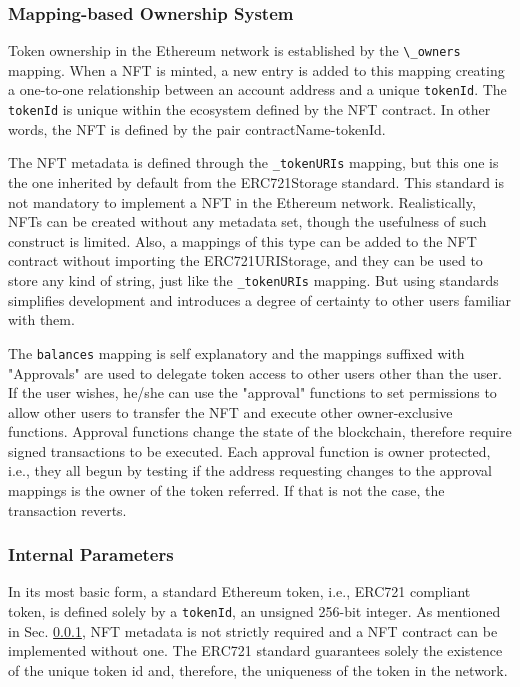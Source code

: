\documentclass[../main.tex]{subfiles}
\begin{document}
\subsubsection{Mapping-based Ownership System}
\label{sec:mappings}
Token ownership in the Ethereum network is established by the \verb|\_owners| mapping. When a NFT is minted, a new entry is added to this mapping creating a one-to-one relationship between an account address and a unique \verb|tokenId|. The \verb|tokenId| is unique within the ecosystem defined by the NFT contract. In other words, the NFT is defined by the pair contractName-tokenId.
\par
The NFT metadata is defined through the \verb|_tokenURIs| mapping, but this one is the one inherited by default from the ERC721Storage standard. This standard is not mandatory to implement a NFT in the Ethereum network. Realistically, NFTs can be created without any metadata set, though the usefulness of such construct is limited. Also, a mappings of this type can be added to the NFT contract without importing the ERC721URIStorage, and they can be used to store any kind of string, just like the \verb|_tokenURIs| mapping. But using standards simplifies development and introduces a degree of certainty to other users familiar with them.
\par
The \verb|balances| mapping is self explanatory and the mappings suffixed with "Approvals" are used to delegate token access to other users other than the user. If the user wishes, he/she can use the "approval" functions to set permissions to allow other users to transfer the NFT and execute other owner-exclusive functions. Approval functions change the state of the blockchain, therefore require signed transactions to be executed. Each approval function is owner protected, i.e., they all begun by testing if the address requesting changes to the approval mappings is the owner of the token referred. If that is not the case, the transaction reverts.

\subsubsection{Internal Parameters}
In its most basic form, a standard Ethereum token, i.e., ERC721 compliant token, is defined solely by a \verb|tokenId|, an unsigned 256-bit integer. As mentioned in Sec. \ref{sec:mappings}, NFT metadata is not strictly required and a NFT contract can be implemented without one. The ERC721 standard guarantees solely the existence of the unique token id and, therefore, the uniqueness of the token in the network.
\end{document}
